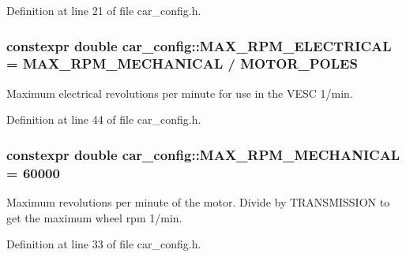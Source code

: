 Definition at line 21 of file car\+\_\+config.\+h.

\subsubsection[{\texorpdfstring{M\+A\+X\+\_\+\+R\+P\+M\+\_\+\+E\+L\+E\+C\+T\+R\+I\+C\+AL}{MAX_RPM_ELECTRICAL}}]{\setlength{\rightskip}{0pt plus 5cm}constexpr double car\+\_\+config\+::\+M\+A\+X\+\_\+\+R\+P\+M\+\_\+\+E\+L\+E\+C\+T\+R\+I\+C\+AL = {\bf M\+A\+X\+\_\+\+R\+P\+M\+\_\+\+M\+E\+C\+H\+A\+N\+I\+C\+AL} / {\bf M\+O\+T\+O\+R\+\_\+\+P\+O\+L\+ES}}\hypertarget{namespacecar__config_aaf4d6a90e2b9c983b0b0d29a584c399b}{}\label{namespacecar__config_aaf4d6a90e2b9c983b0b0d29a584c399b}


Maximum electrical revolutions per minute for use in the V\+E\+SC  1/min. 



Definition at line 44 of file car\+\_\+config.\+h.

\subsubsection[{\texorpdfstring{M\+A\+X\+\_\+\+R\+P\+M\+\_\+\+M\+E\+C\+H\+A\+N\+I\+C\+AL}{MAX_RPM_MECHANICAL}}]{\setlength{\rightskip}{0pt plus 5cm}constexpr double car\+\_\+config\+::\+M\+A\+X\+\_\+\+R\+P\+M\+\_\+\+M\+E\+C\+H\+A\+N\+I\+C\+AL = 60000}\hypertarget{namespacecar__config_ad35069a183782259c6280aa219b72ffa}{}\label{namespacecar__config_ad35069a183782259c6280aa219b72ffa}


Maximum revolutions per minute of the motor. Divide by T\+R\+A\+N\+S\+M\+I\+S\+S\+I\+ON to get the maximum wheel rpm  1/min. 



Definition at line 33 of file car\+\_\+config.\+h.

